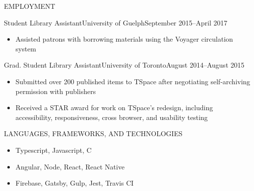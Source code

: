 \documentclass[]{mcdowellcv}
\begin{document}
	\begin{cvsection}{EMPLOYMENT}
		\begin{cvsubsection}{Student Library Assistant}{University of Guelph}{September 2015--April 2017}
			\begin{itemize}
				\item Assisted patrons with borrowing materials using the Voyager circulation system
			\end{itemize}
		\end{cvsubsection}
		
		
		\begin{cvsubsection}{Grad. Student Library Assistant}{University of Toronto}{August 2014--August 2015}		
			\begin{itemize}
                \item Submitted over 200 published items to TSpace after negotiating self-archiving permission with publishers
                \item Received a STAR award for work on TSpace's redesign, including accessibility, responsiveness, cross browser, and usability testing
			\end{itemize}
		\end{cvsubsection}
		
	\end{cvsection}

	\begin{cvsection}{LANGUAGES, FRAMEWORKS, AND TECHNOLOGIES}
		\begin{cvsubsection}{}{}{}	
			\begin{itemize}
				\item Typescript, Javascript, C
				\item Angular, Node, React, React Native
				\item Firebase, Gatsby, Gulp, Jest, Travis CI
			\end{itemize}
		\end{cvsubsection}
	\end{cvsection}
	
\end{document}
